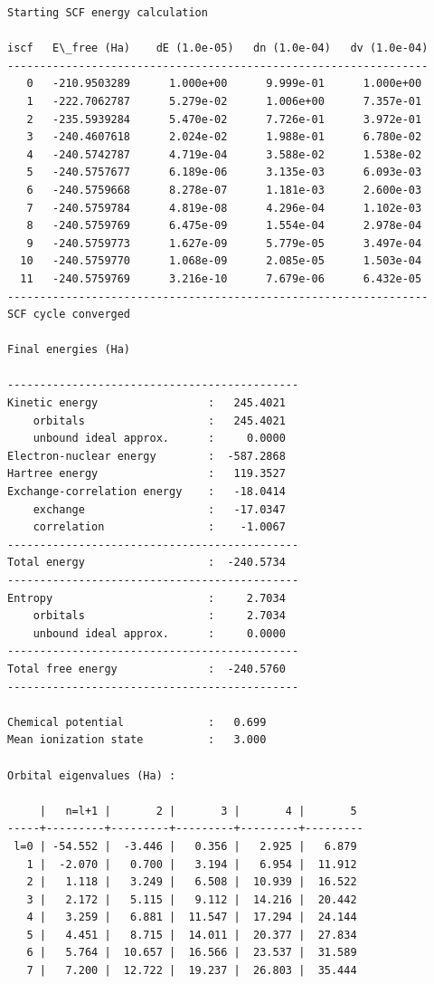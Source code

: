 \documentclass[9pt]{article}
\begin{document}
    \begin{Verbatim}[commandchars=\\\{\}]
Starting SCF energy calculation

iscf   E\_free (Ha)    dE (1.0e-05)   dn (1.0e-04)   dv (1.0e-04)
-----------------------------------------------------------------
   0   -210.9503289      1.000e+00      9.999e-01      1.000e+00
   1   -222.7062787      5.279e-02      1.006e+00      7.357e-01
   2   -235.5939284      5.470e-02      7.726e-01      3.972e-01
   3   -240.4607618      2.024e-02      1.988e-01      6.780e-02
   4   -240.5742787      4.719e-04      3.588e-02      1.538e-02
   5   -240.5757677      6.189e-06      3.135e-03      6.093e-03
   6   -240.5759668      8.278e-07      1.181e-03      2.600e-03
   7   -240.5759784      4.819e-08      4.296e-04      1.102e-03
   8   -240.5759769      6.475e-09      1.554e-04      2.978e-04
   9   -240.5759773      1.627e-09      5.779e-05      3.497e-04
  10   -240.5759770      1.068e-09      2.085e-05      1.503e-04
  11   -240.5759769      3.216e-10      7.679e-06      6.432e-05
-----------------------------------------------------------------
SCF cycle converged

Final energies (Ha)

---------------------------------------------
Kinetic energy                 :   245.4021
    orbitals                   :   245.4021
    unbound ideal approx.      :     0.0000
Electron-nuclear energy        :  -587.2868
Hartree energy                 :   119.3527
Exchange-correlation energy    :   -18.0414
    exchange                   :   -17.0347
    correlation                :    -1.0067
---------------------------------------------
Total energy                   :  -240.5734
---------------------------------------------
Entropy                        :     2.7034
    orbitals                   :     2.7034
    unbound ideal approx.      :     0.0000
---------------------------------------------
Total free energy              :  -240.5760
---------------------------------------------

Chemical potential             :   0.699
Mean ionization state          :   3.000

Orbital eigenvalues (Ha) :

     |   n=l+1 |       2 |       3 |       4 |       5
-----+---------+---------+---------+---------+---------
 l=0 | -54.552 |  -3.446 |   0.356 |   2.925 |   6.879
   1 |  -2.070 |   0.700 |   3.194 |   6.954 |  11.912
   2 |   1.118 |   3.249 |   6.508 |  10.939 |  16.522
   3 |   2.172 |   5.115 |   9.112 |  14.216 |  20.442
   4 |   3.259 |   6.881 |  11.547 |  17.294 |  24.144
   5 |   4.451 |   8.715 |  14.011 |  20.377 |  27.834
   6 |   5.764 |  10.657 |  16.566 |  23.537 |  31.589
   7 |   7.200 |  12.722 |  19.237 |  26.803 |  35.444



\end{Verbatim}
\end{document}
